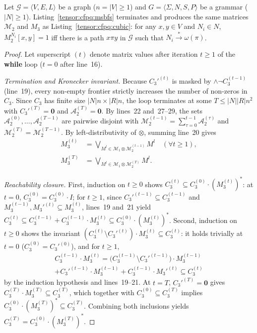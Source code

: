 \begin{theorem}
\label{thm:msbfs_correct}
    Let $\mathcal{G} = \langle V, E, L \rangle$ be a graph ($n = |V| \ge 1$) and $G = \langle \Sigma, N, S, P \rangle$ be a grammar ($|N| \ge 1$).
    Listing~\ref{tensor:cfpq:msbfs} terminates and produces the same matrices $\mathcal{M}_2$ and $M_3$ as Listing~\ref{tensor:cfpq:cubic}: for any $x, y \in V$ and $N_i \in N$, $M_2^{N_i}[x, y] = 1$ iff there is a path $x\pi y$ in $\mathcal{G}$ such that $N_i \xrightarrow{*} \omega(\pi)$.
\end{theorem}
\begin{proof}
Let superscript $(t)$ denote matrix values after iteration $t \ge 1$ of the \textbf{while} loop ($t = 0$ after line~16).

\emph{Termination and Kronecker invariant.}
Because $C_3'^{(t)}$ is masked by $\wedge \neg C_3^{(t-1)}$ (line~19), every non-empty frontier strictly increases the number of non-zeros in $C_3$.
Since $C_3$ has finite size $|N|n \times |R|n$, the loop terminates at some $T \le |N||R|n^2$ with $C_3'^{(T)} = \mathbf{0}$ and $\mathcal{A}_2^{(T)} = \mathbf{0}$.
By lines~22 and~27--29, the sets $\mathcal{A}_2^{(0)}, \dots, \mathcal{A}_2^{(T-1)}$ are pairwise disjoint with $\mathcal{M}_2^{(t-1)} = \sum_{\tau=0}^{t-1} \mathcal{A}_2^{(\tau)}$ and $\mathcal{M}_2^{(T)} = \mathcal{M}_2^{(T-1)}$.
By left-distributivity of $\otimes$, summing line~20 gives
\begin{align*}
M_3^{(t)} &= \bigvee_{M^l \in \mathcal{M}_1 \otimes \mathcal{M}_2^{(t-1)}} M^l \quad (\forall t \ge 1), \\
M_3^{(T)} &= \bigvee_{M^l \in \mathcal{M}_1 \otimes \mathcal{M}_2^{(T)}} M^l.
\end{align*}

\emph{Reachability closure.}
First, induction on $t \ge 0$ shows $C_3^{(t)} \subseteq C_3^{(0)} \cdot (M_3^{(t)})^*$: at $t = 0$, $C_3^{(0)} = C_3^{(0)} \cdot I$; for $t \ge 1$, since $C_3'^{(t-1)} \subseteq C_3^{(t-1)}$ and $M_3^{(t-1)}, M_3'^{(t)} \subseteq M_3^{(t)}$, lines~19 and~21 yield $C_3^{(t)} \subseteq C_3^{(t-1)} + C_3^{(t-1)} \cdot M_3^{(t)} \subseteq C_3^{(0)} \cdot (M_3^{(t)})^*$.
Second, induction on $t \ge 0$ shows the invariant $(C_3^{(t)} \setminus C_3'^{(t)}) \cdot M_3^{(t)} \subseteq C_3^{(t)}$: it holds trivially at $t = 0$ ($C_3^{(0)} = C_3'^{(0)}$), and for $t \ge 1$,
\begin{multline*}
C_3^{(t-1)} \cdot M_3^{(t)} = \big(C_3^{(t-1)} \setminus C_3'^{(t-1)}\big) \cdot M_3^{(t-1)} \\
+ C_3'^{(t-1)} \cdot M_3^{(t-1)} + C_3^{(t-1)} \cdot M_3'^{(t)} \subseteq C_3^{(t)}
\end{multline*}
by the induction hypothesis and lines~19--21.
At $t = T$, $C_3'^{(T)} = \mathbf{0}$ gives $C_3^{(T)} \cdot M_3^{(T)} \subseteq C_3^{(T)}$, which together with $C_3^{(0)} \subseteq C_3^{(T)}$ implies $C_3^{(0)} \cdot (M_3^{(T)})^* \subseteq C_3^{(T)}$.
Combining both inclusions yields $C_3^{(T)} = C_3^{(0)} \cdot (M_3^{(T)})^*$.


\end{proof}
